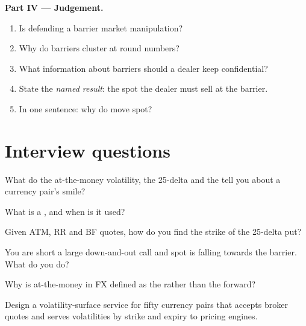 \begin{problem}
\medskip\noindent\textbf{Part IV --- Judgement.}
\begin{enumerate}[resume]
\item Is defending a barrier market manipulation?
\item Why do barriers cluster at round numbers?
\item What information about barriers should a dealer keep confidential?
\item State the \emph{named result}: the spot the dealer must sell at the barrier.
\item In one sentence: why do  move spot?
\end{enumerate}
\end{problem}

\section{Interview questions}

\begin{interviewq}\label{iq:m2:the-fx-options-market:1}
What do the at-the-money volatility, the 25-delta  and the 
tell you about a currency pair's smile?
\end{interviewq}

\begin{interviewq}\label{iq:m2:the-fx-options-market:2}
What is a , and when is it used?
\end{interviewq}

\begin{interviewq}\label{iq:m2:the-fx-options-market:3}
Given ATM, RR and BF quotes, how do you find the strike of the 25-delta put?
\end{interviewq}

\begin{interviewq}\label{iq:m2:the-fx-options-market:4}
You are short a large down-and-out call and spot is falling towards the barrier.
What do you do?
\end{interviewq}

\begin{interviewq}\label{iq:m2:the-fx-options-market:5}
Why is at-the-money in FX defined as the  rather than the
forward?
\end{interviewq}

\begin{interviewq}\label{iq:m2:the-fx-options-market:6}
Design a volatility-surface service for fifty currency pairs that accepts broker
quotes and serves volatilities by strike and expiry to pricing engines.
\end{interviewq}
